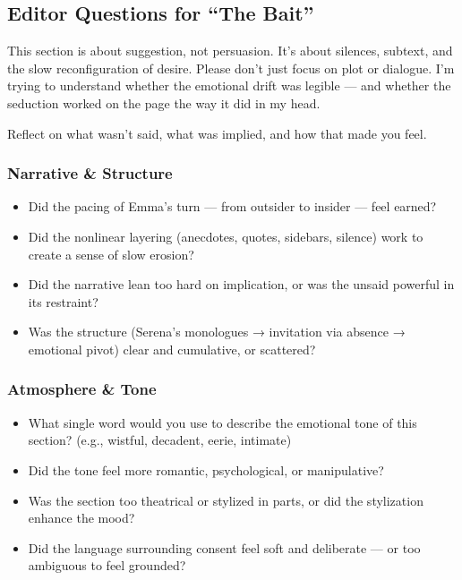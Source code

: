 \subsection*{Editor Questions for ``The Bait''}

This section is about suggestion, not persuasion. It’s about silences, subtext, and the slow reconfiguration of desire.
Please don’t just focus on plot or dialogue. I’m trying to understand whether the emotional drift was legible — and whether the seduction worked on the page the way it did in my head.

Reflect on what wasn’t said, what was implied, and how that made you feel.

\subsubsection{Narrative \& Structure}

\begin{itemize}
\item Did the pacing of Emma’s turn — from outsider to insider — feel earned?
\item Did the nonlinear layering (anecdotes, quotes, sidebars, silence) work to create a sense of slow erosion?
\item Did the narrative lean too hard on implication, or was the unsaid powerful in its restraint?
\item Was the structure (Serena's monologues → invitation via absence → emotional pivot) clear and cumulative, or scattered?
\end{itemize}

\subsubsection{Atmosphere \& Tone}

\begin{itemize}
\item What single word would you use to describe the emotional tone of this section? (e.g., wistful, decadent, eerie, intimate)
\item Did the tone feel more romantic, psychological, or manipulative?
\item Was the section too theatrical or stylized in parts, or did the stylization enhance the mood?
\item Did the language surrounding consent feel soft and deliberate — or too ambiguous to feel grounded?
\end{itemize}


